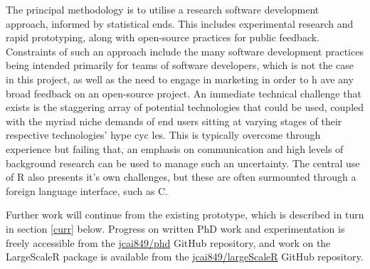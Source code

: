 The principal methodology is to utilise a research software development approach, informed by statistical ends.
This includes experimental research and rapid prototyping, along with open-source practices for public feedback.
Constraints of such an approach include the many software development practices being intended primarily for teams of software developers, which is not the case in this project, as well as the need to engage in marketing in order to h    ave any broad feedback on an open-source project.
An immediate technical challenge that exists is the staggering array of potential technologies that could be used, coupled with the myriad niche demands of end users sitting at varying stages of their respective technologies' hype cyc    les.
This is typically overcome through experience but failing that, an emphasis on communication and high levels of background research can be used to manage such an uncertainty.
The central use of R also presents it's own challenges, but these are often surmounted through a foreign language interface, such as C.

Further work will continue from the existing prototype, which is described in turn in section \ref{curr} below.
Progress on written PhD work and experimentation is freely accessible from the \href{https://github.com/jcai849/phd}{jcai849/phd} GitHub repository, and work on the LargeScaleR package is available from the \href{https://github.com/jc    ai849/phd}{jcai849/largeScaleR} GitHub repository.
